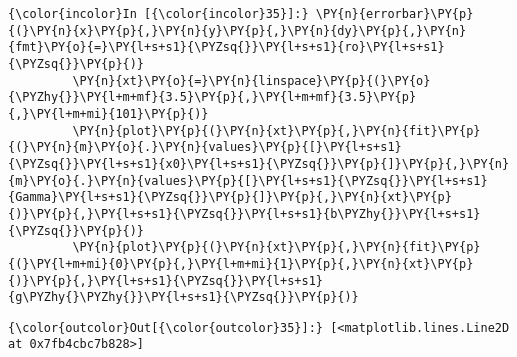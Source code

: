     \begin{Verbatim}[commandchars=\\\{\}]
{\color{incolor}In [{\color{incolor}35}]:} \PY{n}{errorbar}\PY{p}{(}\PY{n}{x}\PY{p}{,}\PY{n}{y}\PY{p}{,}\PY{n}{dy}\PY{p}{,}\PY{n}{fmt}\PY{o}{=}\PY{l+s+s1}{\PYZsq{}}\PY{l+s+s1}{ro}\PY{l+s+s1}{\PYZsq{}}\PY{p}{)}
         \PY{n}{xt}\PY{o}{=}\PY{n}{linspace}\PY{p}{(}\PY{o}{\PYZhy{}}\PY{l+m+mf}{3.5}\PY{p}{,}\PY{l+m+mf}{3.5}\PY{p}{,}\PY{l+m+mi}{101}\PY{p}{)}
         \PY{n}{plot}\PY{p}{(}\PY{n}{xt}\PY{p}{,}\PY{n}{fit}\PY{p}{(}\PY{n}{m}\PY{o}{.}\PY{n}{values}\PY{p}{[}\PY{l+s+s1}{\PYZsq{}}\PY{l+s+s1}{x0}\PY{l+s+s1}{\PYZsq{}}\PY{p}{]}\PY{p}{,}\PY{n}{m}\PY{o}{.}\PY{n}{values}\PY{p}{[}\PY{l+s+s1}{\PYZsq{}}\PY{l+s+s1}{Gamma}\PY{l+s+s1}{\PYZsq{}}\PY{p}{]}\PY{p}{,}\PY{n}{xt}\PY{p}{)}\PY{p}{,}\PY{l+s+s1}{\PYZsq{}}\PY{l+s+s1}{b\PYZhy{}}\PY{l+s+s1}{\PYZsq{}}\PY{p}{)}
         \PY{n}{plot}\PY{p}{(}\PY{n}{xt}\PY{p}{,}\PY{n}{fit}\PY{p}{(}\PY{l+m+mi}{0}\PY{p}{,}\PY{l+m+mi}{1}\PY{p}{,}\PY{n}{xt}\PY{p}{)}\PY{p}{,}\PY{l+s+s1}{\PYZsq{}}\PY{l+s+s1}{g\PYZhy{}\PYZhy{}}\PY{l+s+s1}{\PYZsq{}}\PY{p}{)}
\end{Verbatim}


\begin{Verbatim}[commandchars=\\\{\}]
{\color{outcolor}Out[{\color{outcolor}35}]:} [<matplotlib.lines.Line2D at 0x7fb4cbc7b828>]
\end{Verbatim}
            
    \begin{center}
    \end{center}
    { \hspace*{\fill} \\}

